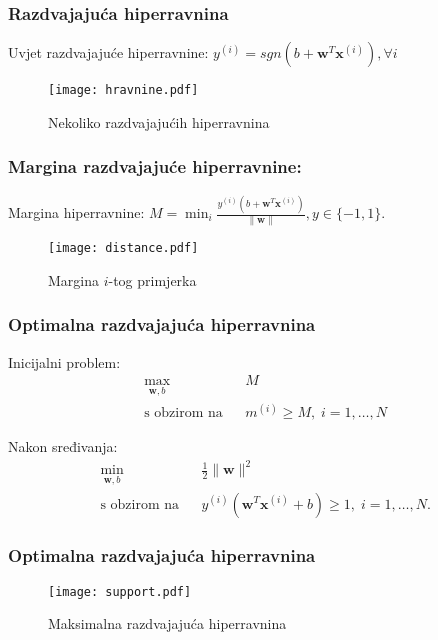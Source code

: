 \documentclass[utf8]{beamer}
\begin{document}
\begin{frame}
\frametitle{Razdvajajuća hiperravnina}
\begin{block}{Uvjet razdvajajuće hiperravnine:}
$y^{(i)} = sgn(b + \mathbf{w}^T\mathbf{x}^{(i)}), \forall i$
\end{block}
\begin{figure}
\texttt{[image: hravnine.pdf]}
\caption{Nekoliko razdvajajućih hiperravnina}
\end{figure}
\end{frame}

\begin{frame}
\frametitle{Margina razdvajajuće hiperravnine:}
\begin{block}{Margina hiperravnine:}
$\displaystyle M=\min_{i}\frac{y^{(i)}(b + \mathbf{w}^T\mathbf{x}^{(i)})}{\|\mathbf{w}\|}, 
y \in \{-1, 1\}.$
\end{block}

\begin{figure}
\texttt{[image: distance.pdf]}
\caption{Margina $i$-tog primjerka}
\end{figure}
\end{frame}

\begin{frame}
\frametitle{Optimalna razdvajajuća hiperravnina}
Inicijalni problem:
\begin{equation*}
\begin{aligned}
& \underset{\mathbf{w}, b}{\text{max}}
& & M \\
& \text{s obzirom na}
& & m^{(i)} \geq M, \; i = 1, \ldots, N
\end{aligned}
\end{equation*}

Nakon sređivanja:
\begin{equation*}
\begin{aligned}
& \underset{\mathbf{w}, b}{\text{min}}
& & \frac{1}{2}\|\mathbf{w}\|^2 \\
& \text{s obzirom na}
& & y^{(i)}(\mathbf{w}^T\mathbf{x}^{(i)} + b) \geq 1, \; i = 1, \ldots, N.
\end{aligned}
\end{equation*}
\end{frame}

\begin{frame}
\frametitle{Optimalna razdvajajuća hiperravnina}
\begin{figure}
\texttt{[image: support.pdf]}
\caption{Maksimalna razdvajajuća hiperravnina}
\end{figure}
\end{frame}
\end{document}
